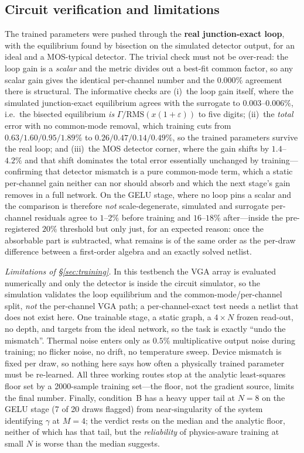 \documentclass[11pt]{article}
\begin{document}
\subsection{Circuit verification and limitations}

The trained parameters were pushed through the \textbf{real junction-exact loop}, with the equilibrium found by bisection on the simulated detector output, for an ideal and a MOS-typical detector. The trivial check must not be over-read: the loop gain is a \textit{scalar} and the metric divides out a best-fit common factor, so any scalar gain gives the identical per-channel number and the $0.000\%$ agreement there is structural. The informative checks are (i)~the loop gain itself, where the simulated junction-exact equilibrium agrees with the surrogate to $\mathbf{0.003}$--$\mathbf{0.006\%}$, i.e.\ the bisected equilibrium \textit{is} $\Gamma/\mathrm{RMS}(x(1+\varepsilon))$ to five digits; (ii)~the \textit{total} error with no common-mode removal, which training cuts from $0.63/1.60/0.95/1.89\%$ to $0.26/0.47/0.14/0.49\%$, so the trained parameters survive the real loop; and (iii)~the MOS detector corner, where the gain shifts by $1.4$--$4.2\%$ and that shift dominates the total error essentially unchanged by training---confirming that detector mismatch is a pure common-mode term, which a static per-channel gain neither can nor should absorb and which the next stage's gain removes in a full network. On the GELU stage, where no loop pins a scalar and the comparison is therefore \textit{not} scale-degenerate, simulated and surrogate per-channel residuals agree to $1$--$2\%$ before training and $16$--$18\%$ after---inside the pre-registered $20\%$ threshold but only just, for an expected reason: once the absorbable part is subtracted, what remains is of the same order as the per-draw difference between a first-order algebra and an exactly solved netlist.

\textit{Limitations of \S\ref{sec:training}.} In this testbench the VGA array is evaluated numerically and only the detector is inside the circuit simulator, so the simulation validates the loop equilibrium and the common-mode/per-channel split, \textit{not} the per-channel VGA path; a per-channel-exact test needs a netlist that does not exist here. One trainable stage, a static graph, a $4\times N$ frozen read-out, no depth, and targets from the ideal network, so the task is exactly ``undo the mismatch''. Thermal noise enters only as $0.5\%$ multiplicative output noise during training; no flicker noise, no drift, no temperature sweep. Device mismatch is fixed per draw, so nothing here says how often a physically trained parameter must be re-learned. All three working routes stop at the analytic least-squares floor set by a 2000-sample training set---the floor, not the gradient source, limits the final number. Finally, condition~B has a heavy upper tail at $N=8$ on the GELU stage (7 of 20 draws flagged) from near-singularity of the system identifying $\gamma$ at $M=4$; the verdict rests on the median and the analytic floor, neither of which has that tail, but the \textit{reliability} of physics-aware training at small $N$ is worse than the median suggests.
\end{document}
